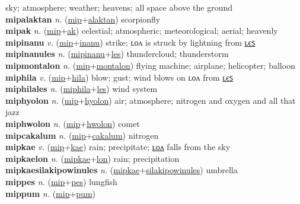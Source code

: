 sky; atmosphere; weather; heavens; all space above the ground \label{mip} \\
\textbf{mipalaktan} \textit{n.} (\hyperref[mip]{mip}+\hyperref[alaktan]{alaktan})
scorpionfly \label{mipalaktan} \\
\textbf{mipak} \textit{n.} (\hyperref[mip]{mip}+\hyperref[ak]{ak})
celestial; atmospheric; meteorological; aerial; heavenly \label{mipak} \\
\textbf{mipinanu} \textit{v.} (\hyperref[mip]{mip}+\hyperref[inanu]{inanu})
strike; ʟᴏᴧ is struck by lightning from \hyperref[mipinanules]{ʟєꜱ} \label{mipinanu} \\
\textbf{mipinanules} \textit{n.} (\hyperref[mipinanu]{mipinanu}+\hyperref[les]{les})
thundercloud; thunderstorm \label{mipinanules} \\
\textbf{mipmontalon} \textit{n.} (\hyperref[mip]{mip}+\hyperref[montalon]{montalon})
flying machine; airplane; helicopter; balloon \label{mipmontalon} \\
\textbf{miphila} \textit{v.} (\hyperref[mip]{mip}+\hyperref[hila]{hila})
blow; gust; wind blows on ʟᴏᴧ from \hyperref[miphilales]{ʟєꜱ} \label{miphila} \\
\textbf{miphilales} \textit{n.} (\hyperref[miphila]{miphila}+\hyperref[les]{les})
wind system \label{miphilales} \\
\textbf{miphyolon} \textit{n.} (\hyperref[mip]{mip}+\hyperref[hyolon]{hyolon})
air; atmosphere; nitrogen and oxygen and all that jazz \label{miphyolon} \\
\textbf{miphwolon} \textit{n.} (\hyperref[mip]{mip}+\hyperref[hwolon]{hwolon})
comet \label{miphwolon} \\
\textbf{mipcakalum} \textit{n.} (\hyperref[mip]{mip}+\hyperref[cakalum]{cakalum})
nitrogen \label{mipcakalum} \\
\textbf{mipkae} \textit{v.} (\hyperref[mip]{mip}+\hyperref[kae]{kae})
rain; precipitate; \hyperref[mipkaelon]{ʟᴏᴧ} falls from the sky \label{mipkae} \\
\textbf{mipkaelon} \textit{n.} (\hyperref[mipkae]{mipkae}+\hyperref[lon]{lon})
rain; precipitation \label{mipkaelon} \\
\textbf{mipkaesilakipowinules} \textit{n.} (\hyperref[mipkae]{mipkae}+\hyperref[silakipowinules]{silakipowinules})
umbrella \label{mipkaesilakipowinules} \\
\textbf{mippes} \textit{n.} (\hyperref[mip]{mip}+\hyperref[pes]{pes})
lungfish \label{mippes} \\
\textbf{mippum} \textit{n.} (\hyperref[mip]{mip}+\hyperref[pum]{pum})
